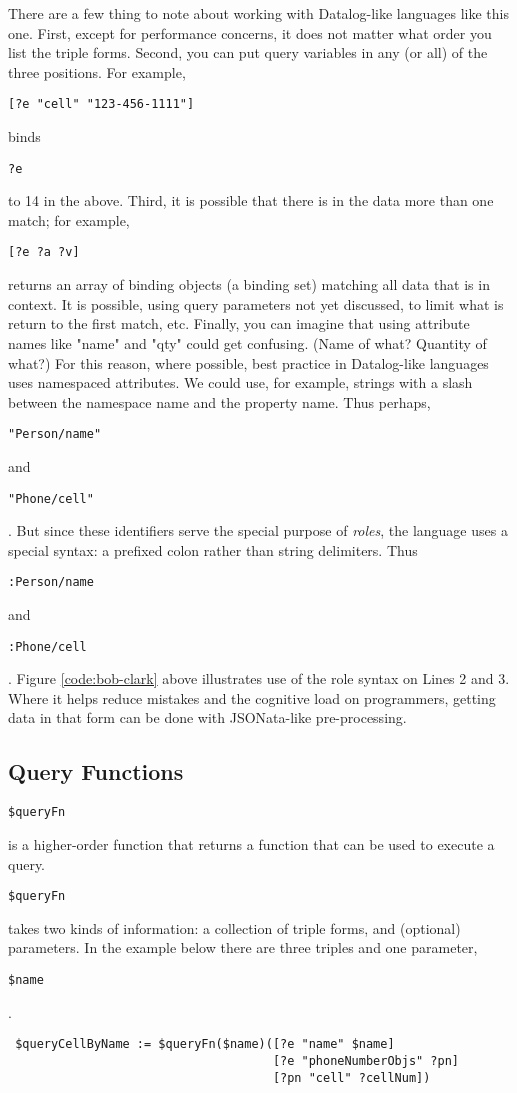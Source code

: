 \documentclass[9pt,letterpaper]{article}
\newcommand{\stt}[1]{\begin{footnotesize}\texttt{#1}\end{footnotesize}}
\begin{document}
There are a few thing to note about working with Datalog-like languages like this one.
First, except for performance concerns, it does not matter what order you list the triple forms.
Second, you can put query variables in any (or all) of the three positions.
For example, \stt{[?e "cell" "123-456-1111"]} binds \stt{?e} to 14 in the above.
Third, it is possible that there is in the data more than one match;
for example, \stt{[?e ?a ?v]} returns an array of binding objects (a binding set) matching all data that is in context.
It is possible, using query parameters not yet discussed, to limit what is return to the first match, etc.
Finally, you can imagine that using attribute names like "name" and "qty" could get confusing. (Name of what? Quantity of what?)
For this reason, where possible, best practice in Datalog-like languages uses namespaced attributes.
We could use, for example, strings with a slash between the namespace name and the property name.
Thus perhaps, \stt{"Person/name"} and \stt{"Phone/cell"}.
But since these identifiers serve the special purpose of \textit{roles}, the language uses a special syntax: a prefixed colon rather than string delimiters.
Thus \stt{:Person/name} and \stt{:Phone/cell}.
Figure \ref{code:bob-clark} above illustrates use of the role syntax on Lines 2 and 3.
Where it helps reduce mistakes and the cognitive load on programmers, getting data in that form can be done with JSONata-like pre-processing.

\subsection{Query Functions}

\stt{\$queryFn} is a higher-order function that returns a function that can be used to execute a query.
\stt{\$queryFn} takes two kinds of information: a collection of triple forms, and (optional) parameters.
In the example below there are three triples and one parameter,  \stt{\$name}.

\begin{lstlisting}
 $queryCellByName := $queryFn($name)([?e "name" $name]
                                     [?e "phoneNumberObjs" ?pn]
                                     [?pn "cell" ?cellNum])
\end{lstlisting}
\end{document}
